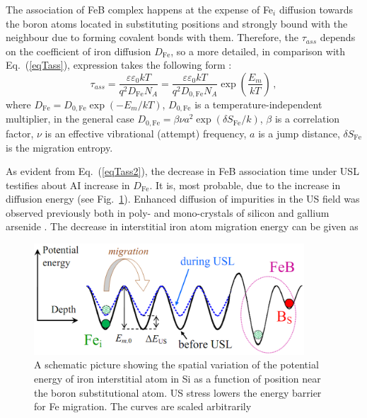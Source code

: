 \documentclass[sn-mathphys]{sn-jnl}%
\theoremstyle{thmstyleone}%
\theoremstyle{thmstyletwo}%
\theoremstyle{thmstylethree}%
\begin{document}
The association of FeB complex happens at the  expense of  Fe$_i$ diffusion towards the
boron atoms located in substituting positions and strongly bound with the neighbour due to forming covalent bonds with them.
Therefore, the $\tau_{ass}$ depends on the coefficient of iron diffusion $D_\mathrm{Fe}$,
so a more detailed, in comparison with Eq.~(\ref{eqTass}), expression takes the following form \cite{FeBAssJAP2014,FeBJAP2005,FeBKin2019}:
\begin{equation}
\label{eqTass2}
\tau_{ass}=\frac{\varepsilon\varepsilon_0 kT}{q^2D_\mathrm{Fe}N_A}=
\frac{\varepsilon\varepsilon_0 kT}{q^2D_\mathrm{0,Fe}N_A}\exp\left(\frac{E_m}{kT}\right)\,,
\end{equation}
where
$D_\mathrm{Fe}=D_\mathrm{0,Fe}\exp(-E_m/kT)$,
$D_\mathrm{0,Fe}$ is a temperature-independent multiplier,
in the general case \cite{AZIZ2001,Stavola,WeberFe}
$D_\mathrm{0,Fe}=\beta\nu a^2\exp(\delta S_\mathrm{Fe}/k)$,
$\beta$ is a correlation factor,
$\nu$  is an effective vibrational (attempt) frequency,
$a$ is a jump distance,
$\delta S_\mathrm{Fe}$ is the migration entropy.

As evident from Eq.~(\ref{eqTass2}), the decrease in FeB association time under USL testifies about
AI increase in $D_\mathrm{Fe}$.
It is, most probable, due to the increase in diffusion energy (see Fig.~\ref{figUSChem}).
Enhanced diffusion of impurities in the US field was observed previously
both in poly- and mono-crystals of silicon and gallium arsenide \cite{Ostapenko1999,Zaveryukhin2002}.
The decrease in interstitial iron atom migration energy can be given as
\begin{figure}
\centering
 \includegraphics[width=0.9\textwidth]{Fig7}
\caption{
A schematic picture showing the spatial variation of the potential energy of
iron interstitial atom in Si as a function of position near the boron substitutional atom.
US stress lowers the energy barrier for Fe migration.
The curves are scaled arbitrarily
}
\label{figUSChem}       %
\end{figure}
\end{document}
